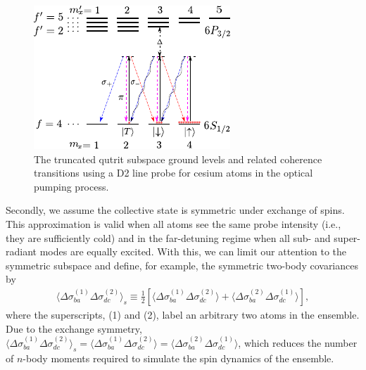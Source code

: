 \documentclass[preprint,aps,pra,onecolumn,superscriptaddress]{revtex4-1} %
\newcommand{\expect}[1]{\big\langle #1 \big\rangle}
\begin{document}
\begin{figure}[htb]
\centering
  \includegraphics[width=.45\textwidth]{fig/FaradaySqueezingLevelStructure}
  \caption{The truncated qutrit subspace ground levels and related coherence transitions using a D2 line probe for cesium atoms in the optical pumping process.}\label{fig:spinsqueezinglevelstructure}
\end{figure}

Secondly, we assume the collective state is symmetric under exchange of spins. This approximation is valid when all atoms see the same probe intensity (i.e., they are sufficiently cold) and in the far-detuning regime when all sub- and super-radiant modes are equally excited. With this, we can limit our attention to the symmetric subspace and define, for example, the symmetric two-body covariances by
\begin{align}
\expect{\Delta\sigma_{ba}^{(1)}\Delta\sigma_{dc}^{(2)}}_s \equiv \frac{1}{2}\left[\expect{\Delta\sigma_{ba}^{(1)}\Delta\sigma_{dc}^{(2)}}+\expect{\Delta\sigma_{ba}^{(2)}\Delta\sigma_{dc}^{(1)}} \right] ,
\end{align}
where the superscripts, (1) and (2), label an arbitrary two atoms in the ensemble. Due to the exchange symmetry, $ \expect{\Delta\sigma_{ba}^{(1)}\Delta\sigma_{dc}^{(2)}}_s=\expect{\Delta\sigma_{ba}^{(1)}\Delta\sigma_{dc}^{(2)}}=\expect{\Delta\sigma_{ba}^{(2)}\Delta\sigma_{dc}^{(1)}} $, which reduces the number of $ n $-body moments required to simulate the spin dynamics of the ensemble.
\end{document}
